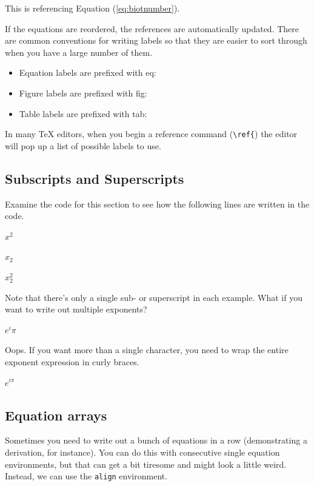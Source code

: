 \documentclass[12pt,a4paper]{article}
\begin{document}
  \vspace{.5cm} %

  This is referencing Equation (\ref{eq:biotnumber}).
  
  \vspace{.5cm} %

  If the equations are reordered, the references are automatically
  updated.  There are common conventions for writing labels so that they
  are easier to sort through when you have a large number of them.  

  \begin{itemize}
    \item Equation labels are prefixed with eq:
    \item Figure labels are prefixed with fig:
    \item Table labels are prefixed with tab:
  \end{itemize}

  In many TeX editors, when you begin a reference command (\verb|\ref{|)
  the editor will pop up a list of possible labels to use.

  \subsection{Subscripts and Superscripts}
  Examine the code for this section to see how the following lines are
  written in the code.

  \begin{center}

  $x^2$

  $x_2$

  $x^2_2$

  \end{center}
  
  Note that there's only a single sub- or superscript in each example.
  What if you want to write out multiple exponents?

  \begin{center}
    $e^i \pi$
  \end{center}

  Oops.  If you want more than a single character, you need to wrap the
  entire exponent expression in curly braces.

  \begin{center}
    $e^{i \pi}$
  \end{center}

  \subsection{Equation arrays}
  Sometimes you need to write out a bunch of equations in a row
  (demonstrating a derivation, for instance).  You can do this with
  consecutive single equation environments, but that can get a bit
  tiresome and might look a little weird.  Instead, we can use the
  \verb|align| environment.  
\end{document}
